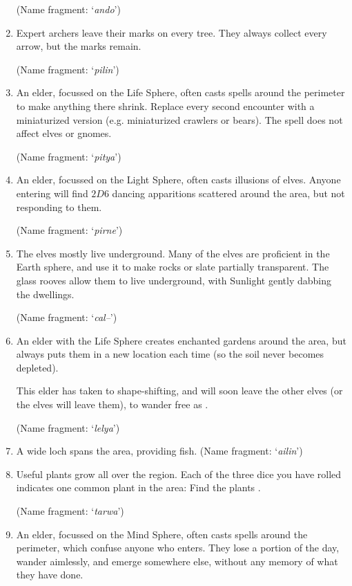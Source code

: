\begin{multicols}{2}
\begin{enumerate}
  (Name fragment: `\textit{ando}')
  \item
  Expert archers leave their marks on every tree.
  They always collect every arrow, but the marks remain.

  (Name fragment: `\textit{pilin}')
  \item
  An elder, focussed on the Life Sphere, often casts spells around the perimeter to make anything there shrink.
  Replace every second encounter with a miniaturized version (e.g. miniaturized \glspl{crawler} or bears).
  The spell does not affect elves or gnomes.

  (Name fragment: `\textit{pitya}')
  \item
  An elder, focussed on the Light Sphere, often casts illusions of elves.
  Anyone entering will find $2D6$ dancing apparitions scattered around the area, but not responding to them.

  (Name fragment: `\textit{pirne}')
  \item
  The elves mostly live underground.
  Many of the elves are proficient in the Earth \gls{sphere}, and use it to make rocks or slate partially transparent.
  The glass rooves allow them to live underground, with Sunlight gently dabbing the dwellings.

  (Name fragment: `\textit{cal--}')
  \ifodd\value{r3}
    \item
    An elder with the Life Sphere creates enchanted gardens around the area, but always puts them in a new location each time (so the soil never becomes depleted).

    This elder has taken to shape-shifting, and will soon leave the other elves (or the elves will leave them), to wander free as .

    (Name fragment: `\textit{lelya}')
  \else
    \item
    A wide loch spans the area, providing fish.
    (Name fragment: `\textit{ailin}')
  \fi
  \item
  Useful plants grow all over the region.
  Each of the three dice you have rolled indicates one common plant in the area:
  \randomPlants
  Find the plants .

  (Name fragment: `\textit{tarwa}')
  \item
  An elder, focussed on the Mind Sphere, often casts spells around the perimeter, which confuse anyone who enters.
  They lose a portion of the day, wander aimlessly, and emerge somewhere else, without any memory of what they have done.


\end{enumerate}
\end{multicols}
